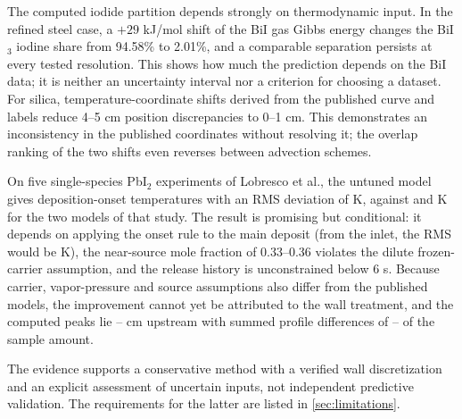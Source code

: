 The computed iodide partition depends strongly on thermodynamic input. In the
refined steel case, a $+29$ kJ/mol shift of the BiI gas Gibbs energy
changes the BiI$_3$ iodine share from 94.58\% to 2.01\%, and a
comparable separation persists at every tested resolution. This shows how much the prediction depends on the BiI data;
it is neither an uncertainty interval nor a criterion for choosing a
dataset. For silica, temperature-coordinate shifts derived from the
published curve and labels reduce 4--5 cm position discrepancies to
0--1 cm. This demonstrates an inconsistency in the published coordinates
without resolving it; the overlap ranking of the two shifts even
reverses between advection schemes.

On five single-species PbI$_2$ experiments of Lobresco et al., the
untuned model gives deposition-onset temperatures with an RMS deviation
of \LobRMS{} K, against \LobRMSTemp{} and \LobRMSVap{} K for the two
models of that study. The result is promising but conditional: it
depends on applying the onset rule to the main deposit (from the inlet,
the RMS would be \LobRMSInlet{} K), the near-source mole fraction of
0.33--0.36 violates the dilute frozen-carrier assumption, and the
release history is unconstrained below 6 s. Because carrier,
vapor-pressure and source assumptions also differ from the published
models, the improvement cannot yet be attributed to the wall treatment,
and the computed peaks lie \LobShiftMin--\LobShiftMax{} cm upstream
with summed profile differences of \LobLOneMin--\LobLOneMax{} of the
sample amount.

The evidence supports a conservative method with a verified wall
discretization and an explicit assessment of uncertain inputs, not
independent predictive validation. The requirements for the latter are
listed in \cref{sec:limitations}.

